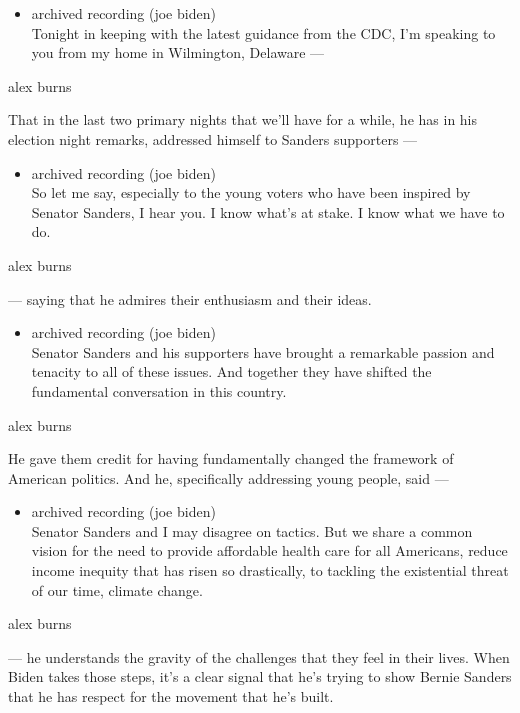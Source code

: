 \begin{itemize}
\tightlist
\item
  archived recording (joe biden)\\
  Tonight in keeping with the latest guidance from the CDC, I'm speaking
  to you from my home in Wilmington, Delaware ---
\end{itemize}

alex burns

That in the last two primary nights that we'll have for a while, he has
in his election night remarks, addressed himself to Sanders supporters
---

\begin{itemize}
\tightlist
\item
  archived recording (joe biden)\\
  So let me say, especially to the young voters who have been inspired
  by Senator Sanders, I hear you. I know what's at stake. I know what we
  have to do.
\end{itemize}

alex burns

--- saying that he admires their enthusiasm and their ideas.

\begin{itemize}
\tightlist
\item
  archived recording (joe biden)\\
  Senator Sanders and his supporters have brought a remarkable passion
  and tenacity to all of these issues. And together they have shifted
  the fundamental conversation in this country.
\end{itemize}

alex burns

He gave them credit for having fundamentally changed the framework of
American politics. And he, specifically addressing young people, said
---

\begin{itemize}
\tightlist
\item
  archived recording (joe biden)\\
  Senator Sanders and I may disagree on tactics. But we share a common
  vision for the need to provide affordable health care for all
  Americans, reduce income inequity that has risen so drastically, to
  tackling the existential threat of our time, climate change.
\end{itemize}

alex burns

--- he understands the gravity of the challenges that they feel in their
lives. When Biden takes those steps, it's a clear signal that he's
trying to show Bernie Sanders that he has respect for the movement that
he's built.

